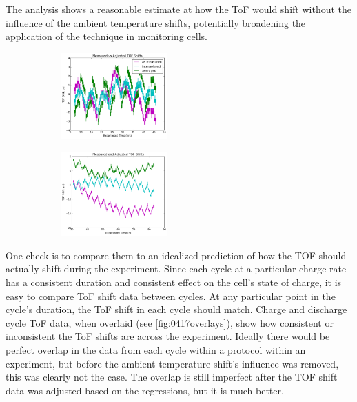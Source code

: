 The analysis shows a reasonable estimate at how the ToF would shift without the influence of the ambient temperature shifts, potentially broadening the application of the technique in monitoring cells.

\begin{figure}[t!]\label{fig:adj}
\centering
\caption{ToF Shift across Experiments C (left) and D (right). This plot compares the unaltered ToF shift, the ToF shift adjusted using a change in ToF - change in temperature regression using interpolated temperatures, and the ToF shift adjusted using a regression of maximum change in ToF shifts and averaged temperatures.}
     \begin{subfigure}
         \centering
         \includegraphics[width=0.45\textwidth]{Thesis/0409adj.png}
     \end{subfigure}
     \hfill
     \begin{subfigure}
         \centering
         \includegraphics[width=0.45\textwidth]{0417tofshiftadj.png}
     \end{subfigure}
\end{figure}

One check is to compare them to an idealized prediction of how the TOF should actually shift during the experiment. 
Since each cycle at a particular charge rate has a consistent duration and consistent effect on the cell's state of charge, it is easy to compare ToF shift data between cycles. 
At any particular point in the cycle's duration, the ToF shift in each cycle should match. Charge and discharge cycle ToF data, when overlaid (see \hyperref[fig:0417overlays]{\cref{fig:0417overlays}}), show how consistent or inconsistent the ToF shifts are across the experiment.
Ideally there would be perfect overlap in the data from each cycle within a protocol within an experiment, but before the ambient temperature shift's influence was removed, this was clearly not the case. 
The overlap is still imperfect after the TOF shift data was adjusted based on the regressions, but it is much better.

